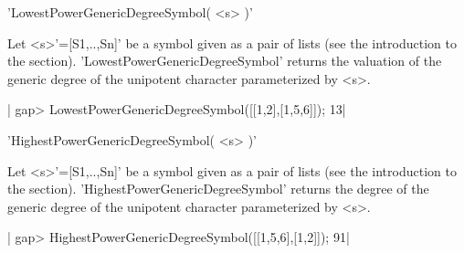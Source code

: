 %
%

'LowestPowerGenericDegreeSymbol( <s> )'

Let  <s>'=[S1,..,Sn]' be  a symbol  given as  a pair  of lists  (see the
introduction to  the section).  'LowestPowerGenericDegreeSymbol' returns
the  valuation  of  the  generic   degree  of  the  unipotent  character
parameterized by <s>.

|    gap> LowestPowerGenericDegreeSymbol([[1,2],[1,5,6]]);
     13|

%
%

'HighestPowerGenericDegreeSymbol( <s> )'

Let  <s>'=[S1,..,Sn]'  be  a  symbol  given as  a  pair  of  lists  (see
the  introduction  to  the  section).  'HighestPowerGenericDegreeSymbol'
returns  the degree  of the  generic degree  of the  unipotent character
parameterized by <s>.

|    gap> HighestPowerGenericDegreeSymbol([[1,5,6],[1,2]]);
      91|

